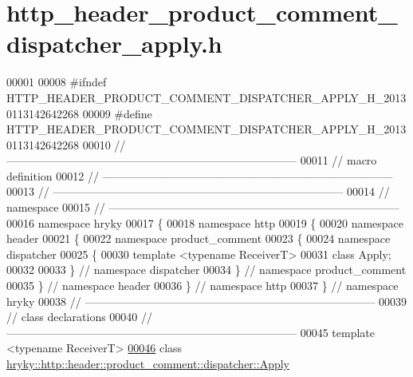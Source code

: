 \hypertarget{http__header__product__comment__dispatcher__apply_8h_source}{\section{http\-\_\-header\-\_\-product\-\_\-comment\-\_\-dispatcher\-\_\-apply.\-h}
}

\begin{DoxyCode}
00001 
00008 \textcolor{preprocessor}{#ifndef HTTP\_HEADER\_PRODUCT\_COMMENT\_DISPATCHER\_APPLY\_H\_20130113142642268}
00009 \textcolor{preprocessor}{}\textcolor{preprocessor}{#define HTTP\_HEADER\_PRODUCT\_COMMENT\_DISPATCHER\_APPLY\_H\_20130113142642268}
00010 \textcolor{preprocessor}{}\textcolor{comment}{//
      ------------------------------------------------------------------------------}
00011 \textcolor{comment}{// macro definition}
00012 \textcolor{comment}{//
      ------------------------------------------------------------------------------}
00013 \textcolor{comment}{//
      ------------------------------------------------------------------------------}
00014 \textcolor{comment}{// namespace}
00015 \textcolor{comment}{//
      ------------------------------------------------------------------------------}
00016 \textcolor{keyword}{namespace }hryky
00017 \{
00018 \textcolor{keyword}{namespace }http
00019 \{
00020 \textcolor{keyword}{namespace }header
00021 \{
00022 \textcolor{keyword}{namespace }product\_comment
00023 \{
00024 \textcolor{keyword}{namespace }dispatcher
00025 \{
00030     \textcolor{keyword}{template} <\textcolor{keyword}{typename} ReceiverT>
00031     \textcolor{keyword}{class }Apply;
00032 
00033 \} \textcolor{comment}{// namespace dispatcher}
00034 \} \textcolor{comment}{// namespace product\_comment}
00035 \} \textcolor{comment}{// namespace header}
00036 \} \textcolor{comment}{// namespace http}
00037 \} \textcolor{comment}{// namespace hryky}
00038 \textcolor{comment}{//
      ------------------------------------------------------------------------------}
00039 \textcolor{comment}{// class declarations}
00040 \textcolor{comment}{//
      ------------------------------------------------------------------------------}
00045 \textcolor{comment}{}\textcolor{keyword}{template} <\textcolor{keyword}{typename} ReceiverT>
\hypertarget{http__header__product__comment__dispatcher__apply_8h_source_l00046}{}\hyperlink{classhryky_1_1http_1_1header_1_1product__comment_1_1dispatcher_1_1_apply}{00046} \textcolor{keyword}{class }\hyperlink{classhryky_1_1http_1_1header_1_1product__comment_1_1dispatcher_1_1_apply}{hryky::http::header::product_comment::dispatcher::Apply}

\end{DoxyCode}
